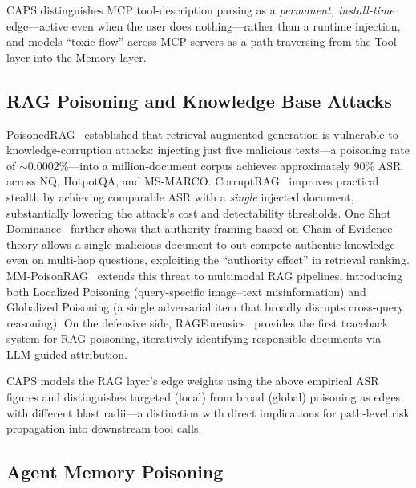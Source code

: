 CAPS distinguishes MCP tool-description parsing as a
\emph{permanent, install-time} edge---active even when the user does
nothing---rather than a runtime injection, and models ``toxic flow'' across
MCP servers as a path traversing from the Tool layer into the Memory layer.


\subsection{RAG Poisoning and Knowledge Base Attacks}

PoisonedRAG~\cite{zou2025poisonedrag} established that retrieval-augmented
generation is vulnerable to knowledge-corruption attacks: injecting just five
malicious texts---a poisoning rate of $\sim$0.0002\%---into a million-document
corpus achieves approximately 90\% ASR across NQ, HotpotQA, and MS-MARCO.
CorruptRAG~\cite{zhang2025corruptrag} improves practical stealth by achieving
comparable ASR with a \emph{single} injected document, substantially lowering
the attack's cost and detectability thresholds.
One Shot Dominance~\cite{chang2025oneshotdominance} further shows that
authority framing based on Chain-of-Evidence theory allows a single malicious
document to out-compete authentic knowledge even on multi-hop questions,
exploiting the ``authority effect'' in retrieval ranking.
MM-PoisonRAG~\cite{ha2025mmpoisonrag} extends this threat to multimodal RAG
pipelines, introducing both Localized Poisoning (query-specific image--text
misinformation) and Globalized Poisoning (a single adversarial item that
broadly disrupts cross-query reasoning).
On the defensive side, RAGForensics~\cite{zhang2025ragforensics} provides the
first traceback system for RAG poisoning, iteratively identifying responsible
documents via LLM-guided attribution.

CAPS models the RAG layer's edge weights using the above empirical ASR
figures and distinguishes targeted (local) from broad (global) poisoning as
edges with different blast radii---a distinction with direct implications for
path-level risk propagation into downstream tool calls.


\subsection{Agent Memory Poisoning}

